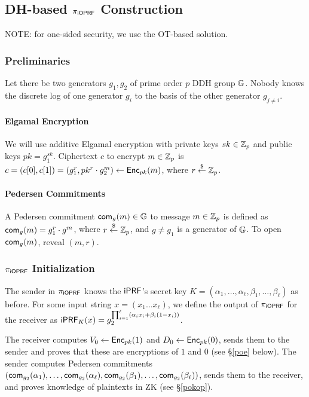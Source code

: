 \subsection{DH-based ${\pi_{\mathsf{i}\mathsf{OPRF}}}$ Construction}
NOTE: for one-sided security, we use the OT-based solution.


\subsubsection{Preliminaries}
Let there be two generators $g_1,g_2$ of prime order $p$ DDH group
$\mathbb{G}$. Nobody knows the discrete log of one generator $g_i$ to the
basis of the other generator $g_{j\neq{}i}$.

\paragraph{Elgamal Encryption}
We will use additive Elgamal encryption with private keys $sk\in\mathbb{Z}_p$
and public keys $pk=g_1^{sk}$. Ciphertext $c$ to encrypt $m\in\mathbb{Z}_p$ is
$c=(c[0],c[1])=(g_1^r,pk^r\cdot{}g_2^m)\leftarrow{\mathsf{Enc}}_{pk}(m)$, where
$r\stackrel{\$}{\leftarrow}\mathbb{Z}_p$.

\paragraph{Pedersen Commitments}
A Pedersen commitment $\mathsf{com}_{g}(m)\in\mathbb{G}$ to message $m\in\mathbb{Z}_p$ is defined as
$\mathsf{com}_{g}(m)=g_1^r\cdot{}g^m$, where $r\stackrel{\$}{\leftarrow}\mathbb{Z}_p$, and $g\neq{}g_1$ is
a generator of $\mathbb{G}$.  To open $\mathsf{com}_{g}(m)$, reveal $(m,r)$.


\subsubsection{${\pi_{\mathsf{i}\mathsf{OPRF}}}$ Initialization}
The sender in ${\pi_{\mathsf{i}\mathsf{OPRF}}}$ knows the $\mathsf{i}\mathsf{PRF}$'s secret key
$K=(\alpha_1,\ldots,\alpha_\ell,\beta_1,\ldots,\beta_\ell)$ as before. For some input
string $x=(x_1\ldots{}x_\ell)$, we define the output of ${\pi_{\mathsf{i}\mathsf{OPRF}}}$ for
the receiver as
$\mathsf{i}\mathsf{PRF}_K(x)=g_2^{\prod_{i=1}^{\ell}(\alpha_i{}x_i+\beta_i(1-x_i))}$.

The receiver computes $V_0 \leftarrow{\mathsf{Enc}}_{pk}(1)$ and
$D_0\leftarrow{\mathsf{Enc}}_{pk}(0)$, sends them to the sender and proves that
these are encryptions of $1$ and $0$ (see \S\ref{poe} below). The
sender computes Pedersen commitments
$(\mathsf{com}_{g_2}(\alpha_1),\ldots,\mathsf{com}_{g_2}(\alpha_\ell),\mathsf{com}_{g_2}(\beta_1),\ldots,\mathsf{com}_{g_2}(\beta_\ell))$,
sends them to the receiver, and proves knowledge of plaintexts in ZK
(see \S\ref{pokop}).

